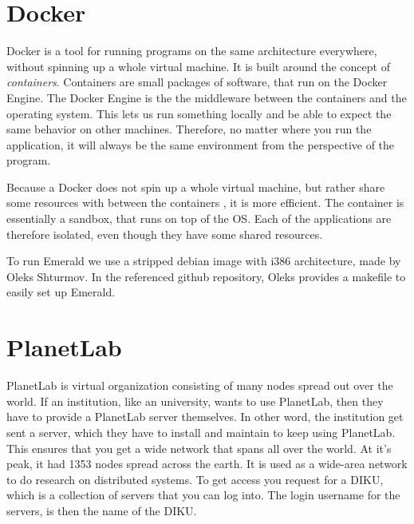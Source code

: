 
\section{Docker}
Docker is a tool for running programs on the same architecture everywhere, without spinning up a whole virtual machine. It is built around the concept of \textit{containers}. Containers are small packages of software, that run on the Docker Engine. The Docker Engine is the the middleware between the containers and the operating system. This lets us run something locally and be able to expect the same behavior on other machines. Therefore, no matter where you run the application, it will always be the same environment from the perspective of the program. 

Because a Docker does not spin up a whole virtual machine, but rather share some resources with between the containers \cite{dockercom_what_nodate}, it is more efficient. The container is essentially a sandbox, that runs on top of the OS. Each of the applications are therefore isolated, even though they have some shared resources.

To run Emerald we use a stripped debian image with i386 architecture, made by Oleks Shturmov\cite{oleks_oleksdocker-in5570v21_2021}.
In the referenced github repository, Oleks provides a makefile to easily set up Emerald.



\section{PlanetLab}
PlanetLab is virtual organization consisting of many nodes spread out over the world. If an institution, like an university, wants to use PlanetLab, then they have to provide a PlanetLab server themselves. In other word, the institution get sent a server, which they have to install and maintain to keep using PlanetLab. This ensures that you get a wide network that spans all over the world. At it's peak, it had 1353 nodes spread across the earth\cite{noauthor_planetlab_nodate}. It is used as a wide-area network to do research on distributed systems. To get access you request for a DIKU, which is a collection of servers that you can log into. The login username for the servers, is then the name of the DIKU.

